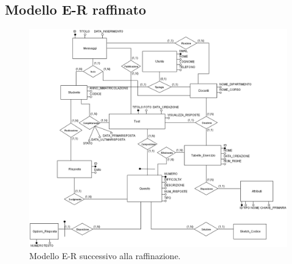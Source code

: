 \documentclass{article}
\begin{document}
\subsection*{Modello E-R raffinato}
\begin{figure}[H]
    \includegraphics*[width=1.1\textwidth]{foto2.png}
    \caption{Modello E-R successivo alla raffinazione.}
\end{figure}
\end{document}
